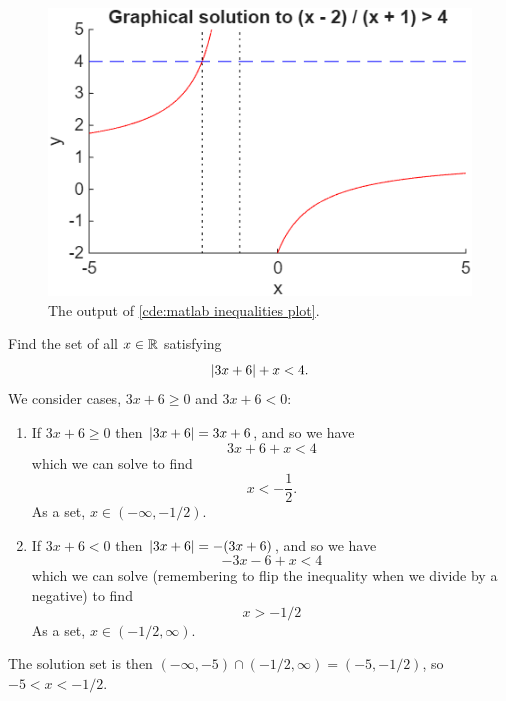 \documentclass[fleqn]{LectureClass/LectureClass}
\begin{document}
    \begin{figure}
        \centering
        \includegraphics{images/matlab-inequalities-plot-output}
        \caption{The output of \cref{cde:matlab inequalities plot}.}
        \label{fig:inequalities example 2 matlab}
    \end{figure}
    
    \begin{exm}{}{}
        Find the set of all \(x \in \mathbb{R}\) satisfying
        \begin{equation}
            \lvert3x + 6\rvert + x < 4.
        \end{equation}
        We consider cases, \(3x + 6 \ge 0\) and \(3x + 6 < 0\):
        \begin{enumerate}
            \item If \(3x + 6 \ge 0\) then \(\lvert3x + 6\rvert = 3x + 6\), and so we have
            \begin{equation}
                3x + 6 + x < 4
            \end{equation}
            which we can solve to find
            \begin{equation}
                x < -\frac{1}{2}.
            \end{equation}
            As a set, \(x \in (-\infty, -1/2)\).
            \item If \(3x + 6 < 0\) then \(\lvert3x + 6\rvert = -(3x + 6)\), and so we have
            \begin{equation}
                -3x - 6 + x < 4
            \end{equation}
            which we can solve (remembering to flip the inequality when we divide by a negative) to find
            \begin{equation}
                x > -1/2
            \end{equation}
            As a set, \(x \in (-1/2, \infty)\).
        \end{enumerate}
        The solution set is then \((-\infty, -5) \cap (-1/2, \infty) = (-5, -1/2)\), so \(-5 < x < -1/2\).
    \end{exm}
    
\end{document}
